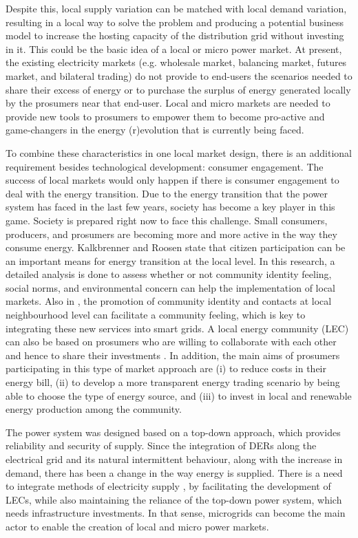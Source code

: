 Despite this, local supply variation can be matched with local demand variation, resulting in a local way to solve the problem \cite{mengelkamp2018designing} and producing a potential business model to increase the hosting capacity of the distribution grid without investing in it. This could be the basic idea of a local or micro power market. At present, the existing electricity markets (e.g. wholesale market, balancing market, futures market, and bilateral trading) do not provide to end-users the scenarios needed to share their excess of energy or to purchase the surplus of  energy generated locally by the prosumers near that end-user. Local and micro markets are needed to provide new tools to prosumers to empower them to become pro-active and game-changers in the energy (r)evolution that is currently being faced. 

To combine these characteristics in one local market design, there is an additional requirement besides technological development: consumer engagement. The success of local markets would only happen if there is consumer engagement to deal with the energy transition. Due to the energy transition that the power system has faced in the last few years, society has become a key player in this game. Society is prepared right now to face this challenge. Small consumers, producers, and prosumers are becoming more and more active in the way they consume energy. Kalkbrenner and Roosen \cite{kalkbrenner2016citizens} state that citizen participation can be an important means for energy transition at the local level. In this research, a detailed analysis is done to assess whether or not community identity feeling, social norms, and environmental concern can help the implementation of local markets. Also in \cite{kalkbrenner2016citizens}, the promotion of community identity and contacts at local neighbourhood level can facilitate a community feeling, which is key to integrating these new services into smart grids. A local energy community (LEC) can also be based on prosumers who are willing to collaborate with each other and hence to share their investments \cite{sousa2018peer}. In addition, the main aims of prosumers participating in this type of market approach are (i) to reduce costs in their energy bill, (ii) to develop a more transparent energy trading scenario by being able to choose the type of energy source, and (iii) to invest in local and renewable energy production among the community.

The power system was designed based on a top-down approach, which provides reliability and security of supply. Since the integration of DERs along the electrical grid and its natural intermittent behaviour, along with the increase in demand, there has been a change in the way energy is supplied. There is a need to integrate methods of electricity supply \cite{peng2017electricity}, by facilitating the development of LECs, while also maintaining the reliance of the top-down power system, which needs infrastructure investments. In that sense, microgrids can become the main actor to enable the creation of local and micro power markets. 

